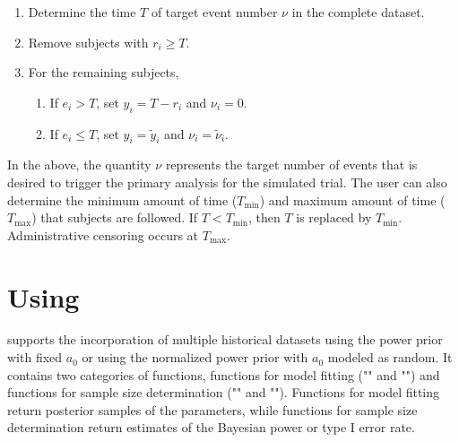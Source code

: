 \begin{enumerate}
    \item Determine the time $T$ of target event number $\nu$ in the complete dataset.
    \item Remove subjects with $r_i \ge T$.
    \item For the remaining subjects, 
    \begin{enumerate}
        \item If $e_i > T$, set $y_i=T-r_i$ and $\nu_i=0$.
        \item If $e_i \le T$, set $y_i=\tilde{y}_i$ and $\nu_i=\tilde{\nu}_i$.
    \end{enumerate}
\end{enumerate}
In the above, the quantity $\nu$ represents the target number of events that is desired to trigger the primary analysis for the simulated trial. The user can also determine the minimum amount of time ($T_{\min}$) and maximum amount of time ($T_{\max}$) that subjects are followed. If $T < T_{\min}$, then $T$ is replaced by $T_{\min}$. Administrative censoring occurs at $T_{\max}$.

\section{Using }\label{usage}
 supports the incorporation of multiple historical datasets using the power prior with fixed $a_0$ or using the normalized power prior with $a_0$ modeled as random. It contains two categories of functions, functions for model fitting ("" and "") and functions for sample size determination ("" and ""). Functions for model fitting return posterior samples of the parameters, while functions for sample size determination return estimates of the Bayesian power or type I error rate. 

